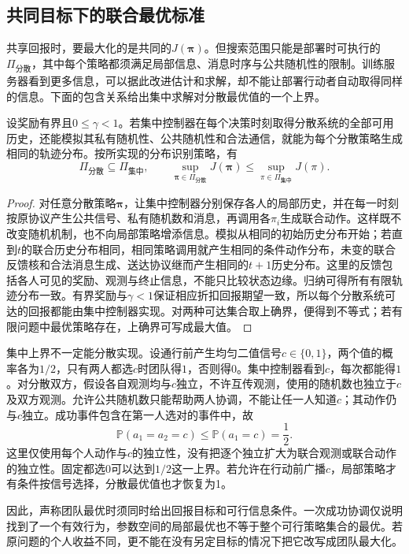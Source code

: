 \subsection{共同目标下的联合最优标准}
\label{sec:rl-multi-agent-team}

共享回报时，要最大化的是共同的$J(\bm\pi)$。但搜索范围只能是部署时可执行的$\Pi_{\text{分散}}$，其中每个策略都须满足局部信息、消息时序与公共随机性的限制。训练服务器看到更多信息，可以据此改进估计和求解，却不能让部署行动者自动取得同样的信息。下面的包含关系给出集中求解对分散最优值的一个上界。

\begin{theorem}[集中与分散策略的可行集合]
\label{thm:rl-multi-agent-inclusion}
设奖励有界且$0\leq\gamma<1$。若集中控制器在每个决策时刻取得分散系统的全部可用历史，还能模拟其私有随机性、公共随机性和合法通信，就能为每个分散策略生成相同的轨迹分布。按所实现的分布识别策略，有
\[
 \Pi_{\text{分散}}\subseteq\Pi_{\text{集中}},
 \qquad
 \sup_{\bm\pi\in\Pi_{\text{分散}}}J(\bm\pi)
 \leq
 \sup_{\pi\in\Pi_{\text{集中}}}J(\pi).
\]
\end{theorem}
\begin{proof}
对任意分散策略$\bm\pi$，让集中控制器分别保存各人的局部历史，并在每一时刻按原协议产生公共信号、私有随机数和消息，再调用各$\pi_i$生成联合动作。这样既不改变随机机制，也不向局部策略增添信息。模拟从相同的初始历史分布开始；若直到$t$的联合历史分布相同，相同策略调用就产生相同的条件动作分布，未变的联合反馈核和合法消息生成、送达协议继而产生相同的$t+1$历史分布。这里的反馈包括各人可见的奖励、观测与终止信息，不能只比较状态边缘。归纳可得所有有限轨迹分布一致。有界奖励与$\gamma<1$保证相应折扣回报期望一致，所以每个分散系统可达的回报都能由集中控制器实现。对两种可达集合取上确界，便得到不等式；若有限问题中最优策略存在，上确界可写成最大值。
\end{proof}

集中上界不一定能分散实现。设通行前产生均匀二值信号$c\in\{0,1\}$，两个值的概率各为$1/2$，只有两人都选$c$时团队得$1$，否则得$0$。集中控制器看到$c$，每次都能得$1$。对分散双方，假设各自观测均与$c$独立，不许互传观测，使用的随机数也独立于$c$及双方观测。允许公共随机数只能帮助两人协调，不能让任一人知道$c$；其动作仍与$c$独立。成功事件包含在第一人选对的事件中，故
\[
 \mathbb P(a_1=a_2=c)\leq\mathbb P(a_1=c)=\frac12.
\]
这里仅使用每个人动作与$c$的独立性，没有把逐个独立扩大为联合观测或联合动作的独立性。固定都选0可以达到$1/2$这一上界。若允许在行动前广播$c$，局部策略才有条件按信号选择，分散最优值也才恢复为1。

因此，声称团队最优时须同时给出回报目标和可行信息条件。一次成功协调仅说明找到了一个有效行为，参数空间的局部最优也不等于整个可行策略集合的最优。若原问题的个人收益不同，更不能在没有另定目标的情况下把它改写成团队最大化。


